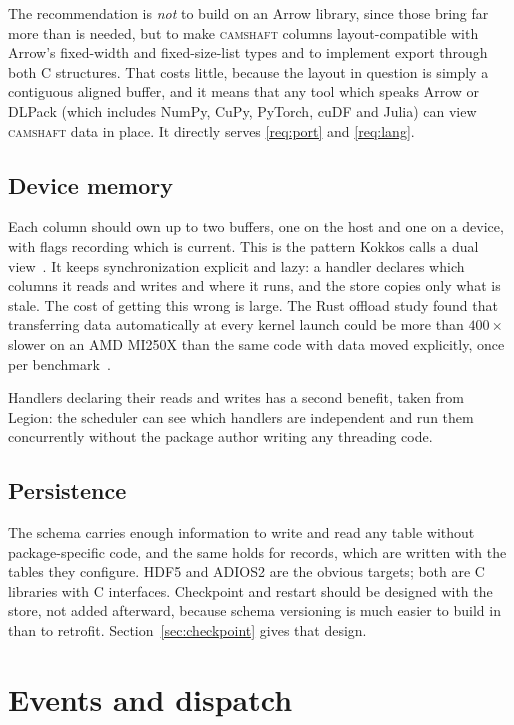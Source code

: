 \documentclass[11pt,a4paper]{article}
\newcommand{\camshaft}{\textsc{camshaft}}
\begin{document}
The recommendation is \emph{not} to build on an Arrow library, since those
bring far more than is needed, but to make \camshaft{} columns layout-compatible
with Arrow's fixed-width and fixed-size-list types and to implement export
through both C structures.  That costs little, because the layout in question
is simply a contiguous aligned buffer, and it means that any tool which speaks
Arrow or DLPack (which includes NumPy, CuPy, PyTorch, cuDF and Julia) can view
\camshaft{} data in place.  It directly serves \ref{req:port} and \ref{req:lang}.

\subsection{Device memory}
\label{sec:device-memory}

Each column should own up to two buffers, one on the host and one on a device,
with flags recording which is current.  This is the pattern Kokkos calls a
dual view~\cite{kokkos3}.  It keeps synchronization explicit and lazy: a
handler declares which columns it reads and writes and where it runs, and the
store copies only what is stale.  The cost of getting this wrong is large.
The Rust offload study found that transferring data automatically at every
kernel launch could be more than $400\times$ slower on an AMD MI250X than the
same code with data moved explicitly, once per benchmark~\cite{rustoffload}.

Handlers declaring their reads and writes has a second benefit, taken from
Legion: the scheduler can see which handlers are independent and run them
concurrently without the package author writing any threading code.

\subsection{Persistence}

The schema carries enough information to write and read any table without
package-specific code, and the same holds for records, which are written
with the tables they configure.  HDF5 and ADIOS2 are the obvious targets; both are C
libraries with C interfaces.  Checkpoint and restart should be designed with
the store, not added afterward, because schema versioning is much easier to
build in than to retrofit.  Section~\ref{sec:checkpoint} gives that design.

\section{Events and dispatch}
\label{sec:dispatch}
\end{document}
